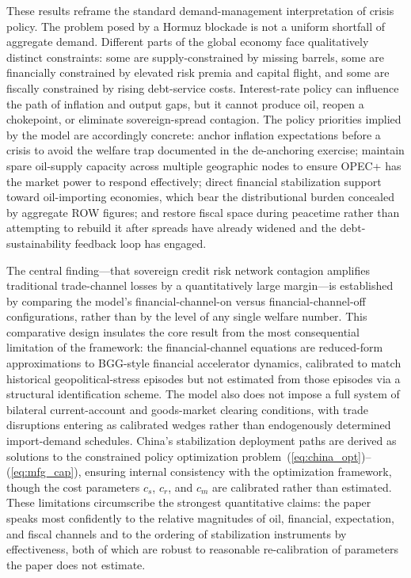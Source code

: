 \documentclass[12pt]{article}
\begin{document}
These results reframe the standard demand-management interpretation of crisis policy. The problem posed by a Hormuz blockade is not a uniform shortfall of aggregate demand. Different parts of the global economy face qualitatively distinct constraints: some are supply-constrained by missing barrels, some are financially constrained by elevated risk premia and capital flight, and some are fiscally constrained by rising debt-service costs. Interest-rate policy can influence the path of inflation and output gaps, but it cannot produce oil, reopen a chokepoint, or eliminate sovereign-spread contagion. The policy priorities implied by the model are accordingly concrete: anchor inflation expectations before a crisis to avoid the welfare trap documented in the de-anchoring exercise; maintain spare oil-supply capacity across multiple geographic nodes to ensure OPEC+ has the market power to respond effectively; direct financial stabilization support toward oil-importing economies, which bear the distributional burden concealed by aggregate ROW figures; and restore fiscal space during peacetime rather than attempting to rebuild it after spreads have already widened and the debt-sustainability feedback loop has engaged.

The central finding---that sovereign credit risk network contagion amplifies traditional trade-channel losses by a quantitatively large margin---is established by comparing the model's financial-channel-on versus financial-channel-off configurations, rather than by the level of any single welfare number. This comparative design insulates the core result from the most consequential limitation of the framework: the financial-channel equations are reduced-form approximations to BGG-style financial accelerator dynamics, calibrated to match historical geopolitical-stress episodes but not estimated from those episodes via a structural identification scheme. The model also does not impose a full system of bilateral current-account and goods-market clearing conditions, with trade disruptions entering as calibrated wedges rather than endogenously determined import-demand schedules. China's stabilization deployment paths are derived as solutions to the constrained policy optimization problem~(\ref{eq:china_opt})--(\ref{eq:mfg_cap}), ensuring internal consistency with the optimization framework, though the cost parameters $c_s$, $c_r$, and $c_m$ are calibrated rather than estimated. These limitations circumscribe the strongest quantitative claims: the paper speaks most confidently to the relative magnitudes of oil, financial, expectation, and fiscal channels and to the ordering of stabilization instruments by effectiveness, both of which are robust to reasonable re-calibration of parameters the paper does not estimate.
\end{document}
